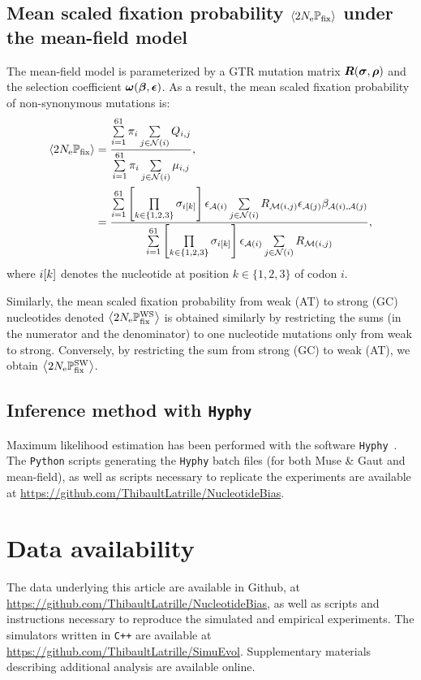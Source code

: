 \documentclass{article}
\begin{document}
\subsection{Mean scaled fixation probability $\left\langle 2 N_{\text{e}} \mathbb{P}_{\text{fix}} \right\rangle$ under the mean-field model}
\label{sec:mut-bias-mean-field-omega}
The mean-field model is parameterized by a {GTR} mutation matrix $\bm{R}(\bm{\sigma}, \bm{\rho})$ and the selection coefficient $\bm{\omega}(\bm{\beta}, \bm{\epsilon})$.
As a result, the mean scaled fixation probability of {non-synonymous} mutations is:
\begin{align}
 \left\langle 2 N_{\text{e}} \mathbb{P}_{\text{fix}} \right\rangle & = \dfrac{ \sum\limits_{{i}=1}^{61} \pi_{{i}} \sum\limits_{{j} \in \mathcal{N}\left({i}\right)} Q_{{i}, {j}}}{ \sum\limits_{{i}=1}^{61} \pi_{{i}} \sum\limits_{{j} \in \mathcal{N}\left({i}\right)} \mu_{{i}, {j}}}, \\
 & = \dfrac{ \sum\limits_{{i}=1}^{61} \left[\prod\limits_{k \in \{ 1, 2, 3 \}} \sigma_{{i}[k]}\right] \epsilon_{\mathcal{A}({i})} \sum\limits_{{j} \in \mathcal{N}\left({i}\right)} R_{\mathcal{M}({i}, {j})} \epsilon_{\mathcal{A}({j})} \beta_{\mathcal{A}({i}), \mathcal{A}({j})} }{\sum\limits_{{i}=1}^{61} \left[\prod\limits_{k \in \{ 1, 2, 3 \}} \sigma_{{i}[k]}\right] \epsilon_{\mathcal{A}({i})} \sum\limits_{{j} \in \mathcal{N}\left({i}\right)} R_{\mathcal{M}({i}, {j})}},
\end{align}
where ${i}[k]$ denotes the nucleotide at position $k \in \{ 1, 2, 3 \}$ of codon $i$.

Similarly, the mean scaled fixation probability from weak (AT) to strong (GC) nucleotides denoted $\left\langle 2 N_{\text{e}} \mathbb{P}_{\text{fix}}^{\text{WS}} \right\rangle$ is obtained similarly by restricting the sums (in the numerator and the denominator) to one nucleotide mutations only from weak to strong.
Conversely, by restricting the sum from strong (GC) to weak (AT), we obtain $\left\langle 2 N_{\text{e}} \mathbb{P}_{\text{fix}}^{\text{SW}} \right\rangle$.

\subsection{Inference method with \texttt{Hyphy}}
\label{subsec:inference-method-with-hyphy}

Maximum {likelihood} estimation has been performed with the software \texttt{Hyphy}~\citep{Pond2005}.
The \texttt{Python} scripts generating the \texttt{Hyphy} batch files (for both Muse \& Gaut and mean-field), as well as scripts necessary to replicate the experiments are available at \url{https://github.com/ThibaultLatrille/NucleotideBias}.

\section{Data availability}
The data underlying this article are available in Github, at \url{https://github.com/ThibaultLatrille/NucleotideBias}, as well as scripts and instructions necessary to reproduce the simulated and empirical experiments.
The simulators written in \texttt{C++} are available at \url{https://github.com/ThibaultLatrille/SimuEvol}.
Supplementary materials describing additional analysis are available online.
\end{document}
